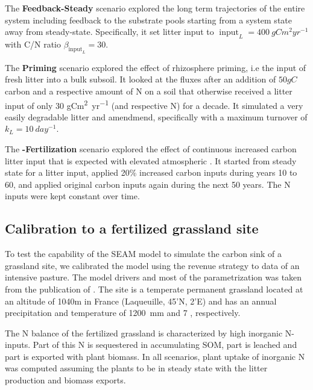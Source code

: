 The \textbf{Feedback-Steady} scenario explored the long term trajectories of the
entire system including feedback to the substrate pools starting from a system
state away from steady-state. Specifically, it set litter input to
$\operatorname{input}_L = 400~\unit{gCm^2yr^{-1}}$ with C/N ratio
$\beta_{\operatorname{input}_L} = 30$.

The \textbf{Priming} scenario explored the effect of rhizosphere priming, i.e
the input of fresh litter into a bulk subsoil. It looked at the fluxes after an
addition of $50gC$ carbon and a respective amount of N on a soil that otherwise
received a litter input of only 30 \unit{gCm^2yr^{-1}} (and
respective N) for a decade. It simulated a very easily degradable litter and
amendmend, specifically with a maximum turnover of $k_L = 10~\unit{day^{-1}}$.

The \textbf{-Fertilization} scenario explored the effect of
continuous increased carbon litter input that is expected with elevated atmospheric .
It started from steady state for a litter input, applied 20\% increased
carbon inputs during years 10 to 60, and applied original carbon inputs again
during the next 50 years. The N inputs were kept constant over time.

\subsection{Calibration to a fertilized grassland site}
\label{sec:methodsPasture}

To test the capability of the SEAM model to simulate the carbon sink of a
grassland site, we calibrated the model using the revenue strategy to data of an
intensive pasture.
The model drivers and most of the parametrization was taken from the publication
of \citep{Perveen14}. The site is a temperate permanent grassland located at an
altitude of 1040m in France (Laqueuille, 45'N,
2'E) and has an annual precipitation and temperature of 1200~mm
and 7 , respectively.

The N balance of the fertilized grassland is characterized by high inorganic
N-inputs. Part of this N is sequestered in accumulating SOM, part is leached and
part is exported with plant biomass. In all scenarios, plant uptake of inorganic N was
computed assuming the plants to be in steady state with the litter
production and biomass exports.
 
